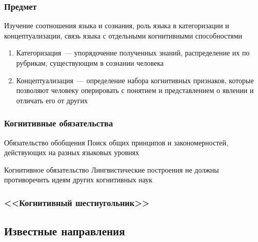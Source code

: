 \begin{frame}
  \frametitle{Предмет}
  Изучение соотношения языка и сознания, роль языка в категоризации и концептуализации, связь языка с отдельными когнитивными способностями

  \vfill

  \begin{enumerate}
    \item Категоризация~--- упорядочение полученных знаний, распределение их по рубрикам, существующим в сознании человека
    \item Концептуализация~--- определение набора когнитивных признаков, которые позволяют человеку оперировать с понятием и представлением о явлении и отличать его от других
  \end{enumerate}
\end{frame}

\begin{frame}
  \frametitle{Когнитивные обязательства}

  \begin{exampleblock}{Обязательство обобщения}
    Поиск общих принципов и закономерностей, действующих на разных языковых уровнях
  \end{exampleblock}

  \begin{exampleblock}{Когнитивное обязательство}
    Лингвистические построения не должны противоречить идеям других когнитивных наук
  \end{exampleblock}
\end{frame}

\begin{frame}
  \frametitle{<<Когнитивный шестиугольник>>}

  \begin{center}
  \end{center}
\end{frame}

\subsection{Известные направления}

